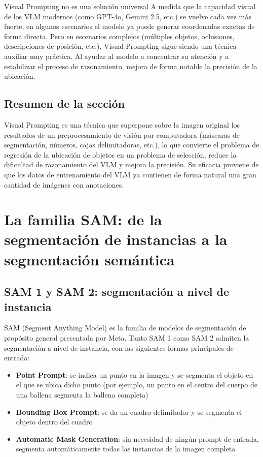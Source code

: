 \documentclass[a4paper]{article}
\begin{document}
\begin{warningbox}{Visual Prompting no es una solución universal}
A medida que la capacidad visual de los VLM modernos (como GPT-4o, Gemini 2.5, etc.) se vuelve cada vez más fuerte, en algunos escenarios el modelo ya puede generar coordenadas exactas de forma directa. Pero en escenarios complejos (múltiples objetos, oclusiones, descripciones de posición, etc.), Visual Prompting sigue siendo una técnica auxiliar muy práctica. Al ayudar al modelo a concentrar su atención y a estabilizar el proceso de razonamiento, mejora de forma notable la precisión de la ubicación.
\end{warningbox}

\subsection{Resumen de la sección}

Visual Prompting es una técnica que superpone sobre la imagen original los resultados de un preprocesamiento de visión por computadora (máscaras de segmentación, números, cajas delimitadoras, etc.), lo que convierte el problema de regresión de la ubicación de objetos en un problema de selección, reduce la dificultad de razonamiento del VLM y mejora la precisión. Su eficacia proviene de que los datos de entrenamiento del VLM ya contienen de forma natural una gran cantidad de imágenes con anotaciones.

\section{La familia SAM: de la segmentación de instancias a la segmentación semántica}

\subsection{SAM 1 y SAM 2: segmentación a nivel de instancia}

SAM (Segment Anything Model) es la familia de modelos de segmentación de propósito general presentada por Meta. Tanto SAM 1 como SAM 2 admiten la segmentación a nivel de instancia, con las siguientes formas principales de entrada:

\begin{itemize}
    \item \textbf{Point Prompt}: se indica un punto en la imagen y se segmenta el objeto en el que se ubica dicho punto (por ejemplo, un punto en el centro del cuerpo de una ballena segmenta la ballena completa)
    \item \textbf{Bounding Box Prompt}: se da un cuadro delimitador y se segmenta el objeto dentro del cuadro
    \item \textbf{Automatic Mask Generation}: sin necesidad de ningún prompt de entrada, segmenta automáticamente todas las instancias de la imagen completa
\end{itemize}
\end{document}
